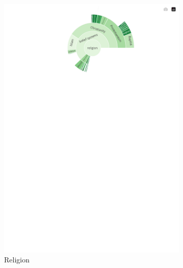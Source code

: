 \begin{figure}[!htbp]
\begin{subfigure}{0.45\textwidth}
		\includegraphics[trim={0 0 0 0},clip,width=\linewidth]{figures/baly_iptc_weighted_prop_leaning_corr_tfidf_zoom_religion.pdf}
		\caption{Religion}
            \label{fig:baly_iptc_weighted_prop_leaning_corr_tfidf_zoom_religion}
	\end{subfigure}
	\begin{subfigure}{0.45\textwidth}

\end{subfigure}
\end{figure}
